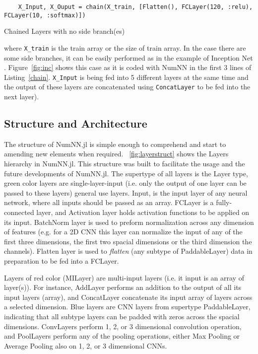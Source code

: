 \begin{listing}[H]
	\begin{verbatim}
	X_Input, X_Ouput = chain(X_train, [Flatten(), FCLayer(120, :relu), FCLayer(10, :softmax)])
	\end{verbatim}
	\caption{Chained Layers with no side branch(es)}\label{chain}
\end{listing}


where \texttt{X_train} is the train array or the size of train array. In the case there are some side branches, it can be easily performed as in the example of Inception Net \cite{Szegedy2016}. Figure~\ref{fig:inc} shows this case as it is coded with NumNN in the first 3 lines of Listing~\ref{chain}. \texttt{X_Input} is being fed into 5 different layers at the same time and the output of these layers are concatenated using \texttt{ConcatLayer} to be fed into the next layer). 


\subsection{Structure and Architecture}\label{subsec:saa}

The structure of NumNN.jl is simple enough to comprehend and start to amending new elements when required. \figurename~\ref{fig:layerstruct} shows the Layers hierarchy in NumNN.jl. This structure was built to facilitate the usage and the future developments of NumNN.jl. The supertype of all layers is the {Layer} type, green color layers are single-layer-input (i.e. only the output of one layer can be passed to these layers) general use layers. Input, is the input layer of any neural network, where all inputs should be passed as an array. FCLayer is a fully-connected layer, and Activation layer holds activation functions to be applied on its input. BatchNorm layer is used to preform normalization across any dimension of features (e.g. for a 2D CNN this layer can normalize the input of any of the first three dimensions, the first two spacial dimensions or the third dimension the channels). Flatten layer is used to \emph{flatten} (any subtype of PaddableLayer) data in preparation to be fed into a FCLayer.

Layers of red color (MILayer) are multi-input layers (i.e. it input is an array of layer(s)). For instance, AddLayer performs an addition to the output of all its input layers (array), and ConcatLayer concatenate its input array of layers across a selected dimension. Blue layers are CNN layers from supertype PaddableLayer, indicating that all subtype layers can be padded with zeros across the spacial dimensions. ConvLayers perform 1, 2, or 3 dimensional convolution operation, and PoolLayers perform any of the pooling operations, either Max Pooling or Average Pooling also on 1, 2, or 3 dimensional CNNs.

